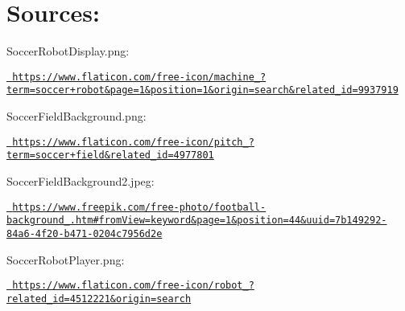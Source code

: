 \chapter{Sources\+:}
\hypertarget{md_resources_2_mention_of_sources}{}\label{md_resources_2_mention_of_sources}
\label{md_resources_2_mention_of_sources_autotoc_md1}%
%


Soccer\+Robot\+Display.\+png\+:


\begin{DoxyItemize}
\item \href{https://www.flaticon.com/free-icon/machine_9937919?term=soccer+robot&page=1&position=1&origin=search&related_id=9937919}{\texttt{ https\+://www.\+flaticon.\+com/free-\/icon/machine\+\_?term=soccer+robot\&page=1\&position=1\&origin=search\&related\+\_\+id=9937919}}
\end{DoxyItemize}

Soccer\+Field\+Background.\+png\+:


\begin{DoxyItemize}
\item \href{https://www.flaticon.com/free-icon/pitch_4977801?term=soccer+field&related_id=4977801}{\texttt{ https\+://www.\+flaticon.\+com/free-\/icon/pitch\+\_?term=soccer+field\&related\+\_\+id=4977801}}
\end{DoxyItemize}

Soccer\+Field\+Background2.\+jpeg\+:


\begin{DoxyItemize}
\item \href{https://www.freepik.com/free-photo/football-background_2336927.htm\#fromView=keyword&page=1&position=44&uuid=7b149292-84a6-4f20-b471-0204c7956d2e}{\texttt{ https\+://www.\+freepik.\+com/free-\/photo/football-\/background\+\_.\+htm\#from\+View=keyword\&page=1\&position=44\&uuid=7b149292-\/84a6-\/4f20-\/b471-\/0204c7956d2e}}
\end{DoxyItemize}

Soccer\+Robot\+Player.\+png\+:


\begin{DoxyItemize}
\item \href{https://www.flaticon.com/free-icon/robot_4512237?related_id=4512221&origin=search}{\texttt{ https\+://www.\+flaticon.\+com/free-\/icon/robot\+\_?related\+\_\+id=4512221\&origin=search}}
\end{DoxyItemize}

